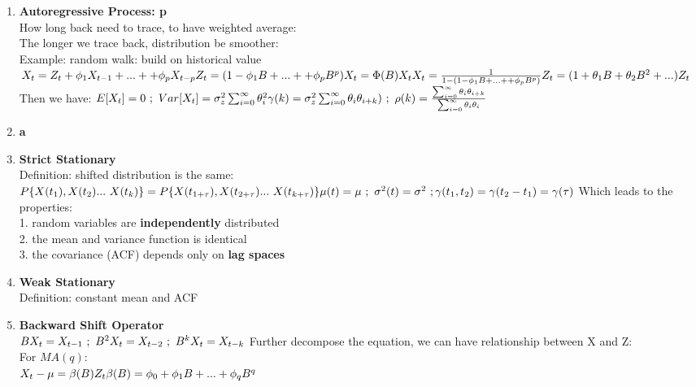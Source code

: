 \documentclass[10pt,landscape]{article}
\begin{document}
\begin{multicols}{3}
\begin{enumerate}
  \item \textbf{Autoregressive Process: p}\\
  		How long back need to trace, to have weighted average:\\
  		The longer we trace back, distribution be smoother:\\
  		Example: random walk: build on historical value\\
		$
		X_t = Z_t + \phi_1X_{t-1} + ... + + \phi_pX_{t-p}\\
		Z_t = (1-\phi_1B + ... + + \phi_pB^p)X_{t}= \Phi(B)X_t\\
		X_t = \frac{1}{1-(1-\phi_1B + ... + + \phi_pB^p)}Z_t = (1+\theta_1B+\theta_2B^2+...)Z_t
		$
		\newline
		\newline
		Then we have:
		$
		E[X_t] = 0 \ ;\ Var[X_t] = \sigma_z^2 \sum_{i=0}^{\infty}\theta_i^2\\
		\gamma(k) = \sigma_z^2 \sum_{i=0}^{\infty} \theta_i\theta_{i+k}) \ ;\ \rho(k) = \frac{\sum_{i=0}^{\infty} \theta_i\theta_{i+k}}{\sum_{i=0}^{\infty} \theta_i\theta_{i}}
		$
		
  		
  \item \textbf{a}
  		
  \item \textbf{Strict Stationary}\\
		Definition: shifted distribution is the same:\\
		$
		P\{X(t_1), X(t_2) ...\ X(t_k)\} = P\{X(t_{1+\tau}), X(t_{2+\tau}) ...\ X(t_{k+\tau})\}\newline
		\mu(t) = \mu \ ; \ \sigma^2(t) = \sigma^2 \ ; \gamma(t_1,t_2) = \gamma(t_2-t_1) = \gamma(\tau)
		$
		Which leads to the properties:\\
		1. random variables are \textbf{independently} distributed\\
		2. the mean and variance function is identical\\
		3. the covariance (ACF) depends only on \textbf{lag spaces}
  \item \textbf{Weak Stationary}\\
  		Definition: constant mean and ACF
  \item \textbf{Backward Shift Operator}\\
  		$
  		BX_t = X_{t-1} \ ; \ B^2X_t = X_{t-2} \ ; \ B^kX_t = X_{t-k}\\
  		$
  		Further decompose the equation, we can have relationship between X and Z:\\
  		For $MA(q)$:\\
  		$
  		X_t - \mu = \beta(B)Z_t\\
  		\beta(B) = \phi_0 + \phi_1B+ ... + \phi_qB^q
  		$
  		

\end{enumerate}
\end{multicols}
\end{document}
